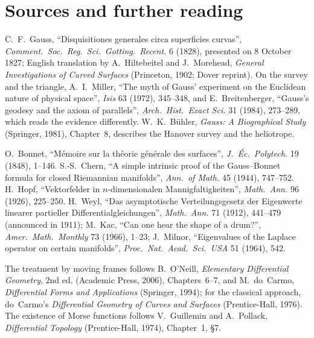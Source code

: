 \section*{Sources and further reading}

C.~F.~Gauss, ``Disquisitiones generales circa superficies curvas'', \emph{Comment.\ Soc.\ Reg.\ Sci.\ Gotting.\ Recent.} 6 (1828), presented on 8 October 1827;
English translation by A.~Hiltebeitel and J.~Morehead, \emph{General Investigations of Curved Surfaces} (Princeton, 1902; Dover reprint). On the survey and the triangle,
A.~I.~Miller, ``The myth of Gauss' experiment on the Euclidean nature of physical space'', \emph{Isis} 63 (1972), 345--348, and E.~Breitenberger, ``Gauss's
geodesy and the axiom of parallels'', \emph{Arch.\ Hist.\ Exact Sci.} 31 (1984), 273--289, which reads the evidence differently. W.~K.~B\"uhler,
\emph{Gauss: A Biographical Study} (Springer, 1981), Chapter~8, describes the Hanover survey and the heliotrope.

O.~Bonnet, ``M\'emoire sur la th\'eorie g\'en\'erale des surfaces'', \emph{J.\ \'Ec.\ Polytech.} 19 (1848), 1--146. S.-S.~Chern, ``A simple intrinsic proof of
the Gauss--Bonnet formula for closed Riemannian manifolds'', \emph{Ann.\ of Math.} 45 (1944), 747--752. H.~Hopf, ``Vektorfelder in $n$-dimensionalen
Mannigfaltigkeiten'', \emph{Math.\ Ann.} 96 (1926), 225--250. H.~Weyl, ``Das asymptotische Verteilungsgesetz der Eigenwerte linearer partieller
Differentialgleichungen'', \emph{Math.\ Ann.} 71 (1912), 441--479 (announced in 1911); M.~Kac, ``Can one hear the shape of a drum?'', \emph{Amer.\ Math.\ Monthly}
73 (1966), 1--23; J.~Milnor, ``Eigenvalues of the Laplace operator on certain manifolds'', \emph{Proc.\ Nat.\ Acad.\ Sci.\ USA} 51 (1964), 542.

The treatment by moving frames follows B.~O'Neill, \emph{Elementary Differential Geometry}, 2nd ed. (Academic Press, 2006), Chapters~6--7, and M.~do~Carmo,
\emph{Differential Forms and Applications} (Springer, 1994); for the classical approach, do~Carmo's \emph{Differential Geometry of Curves and Surfaces}
(Prentice-Hall, 1976). The existence of Morse functions follows V.~Guillemin and A.~Pollack, \emph{Differential Topology} (Prentice-Hall, 1974), Chapter~1, \S7.

